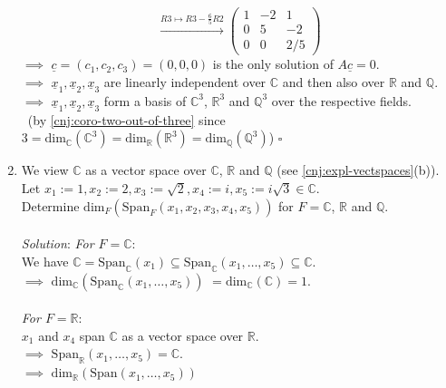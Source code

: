\documentclass[
  12pt,
  a4paper,
  twoside]{article}
\theoremstyle{plain}
\theoremstyle{definition}
\begin{document}
\begin{enumerate}
\[  \xrightarrow{R3 \mapsto R3 - \frac{6}5 R2}
  \begin{pmatrix} 1 & -2 & 1 \\ 0 & 5 & -2 \\ 0 & 0 & 2/5 \end{pmatrix}
  \]
  \(\implies\) \(\underline{c}= (c_1,c_2,c_3) = (0,0,0)\) is the only solution of \(A \underline{c} = 0\).\\
  \(\implies\) \(\underline{x}_1, \underline{x}_2, \underline{x}_3\) are linearly independent over \(\mathbb{C}\) and then also over \(\mathbb{R}\) and \(\mathbb{Q}\).\\
  \(\implies\) \(\underline{x}_1, \underline{x}_2, \underline{x}_3\) form a basis of \(\mathbb{C}^3\), \(\mathbb{R}^3\) and \(\mathbb{Q}^3\) over the respective fields.\\
  \hspace*{0.333em}\hfill~{(by \ref{cnj:coro-two-out-of-three} since \(3 = \mathrm{dim}_{\mathbb{C}}(\mathbb{C}^3) = \mathrm{dim}_{\mathbb{R}}(\mathbb{R}^3) = \mathrm{dim}_{\mathbb{Q}}(\mathbb{Q}^3)\)) \(\square\)}
\item
  We view \(\mathbb{C}\) as a vector space over \(\mathbb{C}\), \(\mathbb{R}\) and \(\mathbb{Q}\) (see \ref{cnj:expl-vectspaces}(b)).\\
  Let \(x_1:=1, x_2:=2, x_3:=\sqrt2, x_4:=i, x_5:=i\sqrt3 \in \mathbb{C}\).\\
  Determine \(\mathrm{dim}_{F}(\mathrm{Span}_{F}(x_1,x_2,x_3,x_4,x_5))\) for \(F = \mathbb{C}\), \(\mathbb{R}\) and \(\mathbb{Q}\).\\
  \hspace*{0.333em}\\
  \emph{Solution}: \emph{For \(F=\mathbb{C}\)}:\\
  We have \(\mathbb{C} = \mathrm{Span}_{\mathbb{C}}(x_1) \subseteq \mathrm{Span}_{\mathbb{C}}(x_1, \dots, x_5) \subseteq \mathbb{C}\).\\
  \(\implies\) \(\mathrm{dim}_{\mathbb{C}}(\mathrm{Span}_{\mathbb{C}}(x_1, \dots, x_5))\)
  \(= \mathrm{dim}_{\mathbb{C}}(\mathbb{C}) = 1\).\\
  \hspace*{0.333em}\\
  \emph{For \(F=\mathbb{R}\)}:\\
  \(x_1\) and \(x_4\) span \(\mathbb{C}\) as a vector space over \(\mathbb{R}\).\\
  \(\implies\) \(\mathrm{Span}_{\mathbb{R}}(x_1, \dots, x_5) = \mathbb{C}\).\\
  \(\implies\) \(\mathrm{dim}_{\mathbb{R}}(\mathrm{Span}(x_1, \dots, x_5))\)

\end{enumerate}
\end{document}
